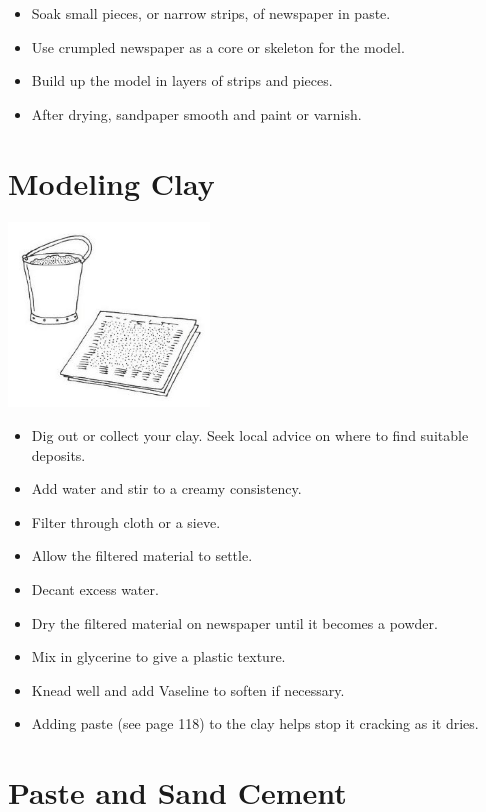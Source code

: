 \begin{multicols}{2}
\begin{itemize}
\item Soak small pieces, or narrow
strips, of newspaper in paste.
\item Use crumpled newspaper as a
core or skeleton for the model.
\item Build up the model in layers of
strips and pieces.
\item After drying, sandpaper smooth
and paint or varnish.
\end{itemize}


\section{Modeling Clay}

\begin{center}
\includegraphics[width=0.4\textwidth]{./img/vso/modeling-clay.jpg}
\end{center}

\begin{itemize}
\item Dig out or collect your clay. Seek local advice on where to find
suitable deposits.
\item Add water and stir to a creamy consistency.
\item Filter through cloth or a sieve.
\item Allow the filtered material to settle.
\item Decant excess water.
\item Dry the filtered material on newspaper until it becomes a powder.
\item Mix in glycerine to give a plastic texture.
\item Knead well and add Vaseline to soften if necessary.
\item Adding paste (see page 118) to the clay helps stop it cracking as it
dries.
\end{itemize}


\section{Paste and Sand Cement}


\end{multicols}
